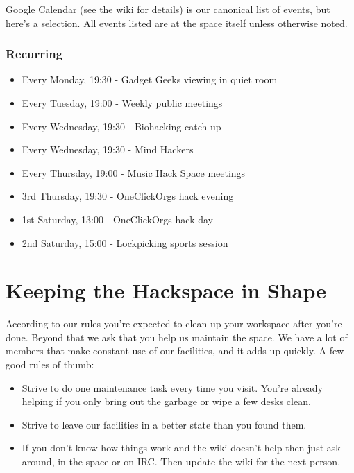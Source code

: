 \documentclass[11pt,a5paper,twoside]{memoir}
\begin{document}
Google Calendar (see the wiki for details) is our canonical list of events, but here's a selection. All events listed are at the space itself unless otherwise noted.

\subsection{Recurring}

\begin{itemize}
	\item Every Monday, 19:30 - Gadget Geeks viewing in quiet room
	\item Every Tuesday, 19:00 - Weekly public meetings
	\item Every Wednesday, 19:30 - Biohacking catch-up
	\item Every Wednesday, 19:30 - Mind Hackers
	\item Every Thursday, 19:00 - Music Hack Space meetings
	\item 3rd Thursday, 19:30 - OneClickOrgs hack evening
	\item 1st Saturday, 13:00 - OneClickOrgs hack day
	\item 2nd Saturday, 15:00 - Lockpicking sports session
\end{itemize}



\chapter{Keeping the Hackspace in Shape}

According to our rules you're expected to clean up your workspace after you're done. Beyond that we ask that you help us maintain the space. We have a lot of members that make constant use of our facilities, and it adds up quickly. A few good rules of thumb:

\begin{itemize}
	\item Strive to do one maintenance task every time you visit. You're already helping if you only bring out the garbage or wipe a few desks clean.
	\item Strive to leave our facilities in a better state than you found them.
	\item If you don't know how things work and the wiki doesn't help then just ask around, in the space or on IRC. Then update the wiki for the next person.
\end{itemize}
\end{document}
